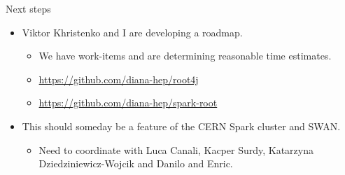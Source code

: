 \documentclass{beamer}
\begin{document}

\begin{frame}{Next steps}
\large
\begin{itemize}\setlength{\itemsep}{0.5 cm}
\item Viktor Khristenko and I are developing a roadmap.
\begin{itemize}
\item We have work-items and are determining reasonable time estimates.
\item \textcolor{blue}{\url{https://github.com/diana-hep/root4j}}
\item \textcolor{blue}{\url{https://github.com/diana-hep/spark-root}}
\end{itemize}

\item This should someday be a feature of the CERN Spark cluster and SWAN.
\begin{itemize}
\item Need to coordinate with Luca Canali, Kacper Surdy, Katarzyna Dziedziniewicz-Wojcik and Danilo and Enric.
\end{itemize}

\end{itemize}
\end{frame}
\end{document}
